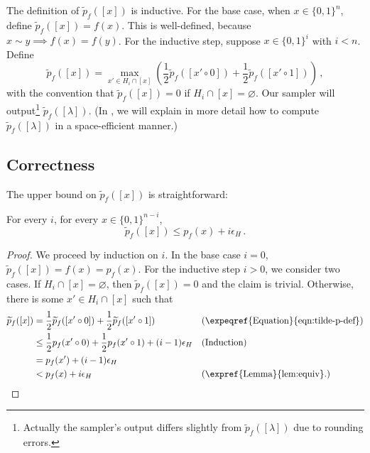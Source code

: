 \documentclass{toc}
\begin{document}
The definition of $\widetilde{p}_f([x])$ is inductive. For the base case, when $x \in \{0, 1\}^n$, define $\widetilde{p}_f([x]) = f(x)$. This is well-defined, because $x \sim y \implies f(x) = f(y)$. For the inductive step, suppose $x \in \{0, 1\}^i$ with $i < n$. Define
\begin{equation} \label{eqn:tilde-p-def}
\widetilde{p}_f([x]) = \max_{x' \in H_i \cap [x]} \left(\frac{1}{2} \widetilde{p}_f([x' \circ 0]) + \frac{1}{2} \widetilde{p}_f([x' \circ 1])\right)\,,
\end{equation}
with the convention that $\widetilde{p}_f([x]) = 0$ if $H_i \cap [x] = \varnothing$. Our sampler will output\footnote{Actually the sampler's output differs slightly from $\widetilde{p}_f([\lambda])$ due to rounding errors.} $\widetilde{p}_f([\lambda])$. (In , we will explain in more detail how to compute $\widetilde{p}_f([\lambda])$ in a space-efficient manner.)

\subsection{Correctness}

The upper bound on $\widetilde{p}_f([x])$ is straightforward:
\begin{claim} \label{clm:const-width-ub}
For every $i$, for every $x \in \{0, 1\}^{n - i}$,
$$
\widetilde{p}_f([x]) \leq p_f(x) + i \epsilon_H\,.
$$
\end{claim}

\begin{proof}
We proceed by induction on $i$. In the base case $i = 0$, $\widetilde{p}_f([x]) = f(x) = p_f(x)$. For the inductive step $i > 0$, we consider two cases. If $H_i \cap [x] = \varnothing$, then $\widetilde{p}_f([x]) = 0$ and the claim is trivial. Otherwise, there is some $x' \in H_i \cap [x]$ such that
\begin{align*}
\widetilde{p}_f([x]) &= \frac{1}{2} \widetilde{p}_f([x' \circ 0]) + \frac{1}{2} \widetilde{p}_f([x' \circ 1]) && (\text{\expeqref{Equation}{eqn:tilde-p-def}}) \\
&\leq \frac{1}{2} p_f(x' \circ 0) + \frac{1}{2} p_f(x' \circ 1) + (i - 1) \epsilon_H && \text{(Induction)} \\
&= p_f(x') + (i - 1) \epsilon_H \\
&< p_f(x) + i \epsilon_H && \text{(\expref{Lemma}{lem:equiv}.)} \qedhere
\end{align*}
\end{proof}
\end{document}
